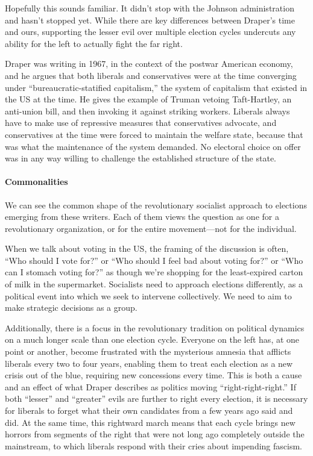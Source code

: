 Hopefully this sounds familiar. It didn't stop with the Johnson administration and hasn't stopped yet. While there are key differences between Draper's time and ours, supporting the lesser evil over multiple election cycles undercuts any ability for the left to actually fight the far right.

Draper was writing in 1967, in the context of the postwar American economy, and he argues that both liberals and conservatives were at the time converging under ``bureaucratic-statified capitalism,'' the system of capitalism that existed in the US at the time. He gives the example of Truman vetoing Taft-Hartley, an anti-union bill, and then invoking it against striking workers. Liberals always have to make use of repressive measures that conservatives advocate, and conservatives at the time were forced to maintain the welfare state, because that was what the maintenance of the system demanded. No electoral choice on offer was in any way willing to challenge the established structure of the state.

\paragraph{Commonalities}

We can see the common shape of the revolutionary socialist approach to elections emerging from these writers. Each of them views the question as one for a revolutionary organization, or for the entire movement---not for the individual.

When we talk about voting in the US, the framing of the discussion is often, ``Who should I vote for?'' or ``Who should I feel bad about voting for?'' or ``Who can I stomach voting for?'' as though we're shopping for the least-expired carton of milk in the supermarket. Socialists need to approach elections differently, as a political event into which we seek to intervene collectively. We need to aim to make strategic decisions as a group.

Additionally, there is a focus in the revolutionary tradition on political dynamics on a much longer scale than one election cycle. Everyone on the left has, at one point or another, become frustrated with the mysterious amnesia that afflicts liberals every two to four years, enabling them to treat each election as a new crisis out of the blue, requiring new concessions every time. This is both a cause and an effect of what Draper describes as politics moving ``right-right-right.'' If both ``lesser'' and ``greater'' evils are further to right every election, it is necessary for liberals to forget what their own candidates from a few years ago said and did. At the same time, this rightward march means that each cycle brings new horrors from segments of the right that were not long ago completely outside the mainstream, to which liberals respond with their cries about impending fascism.

